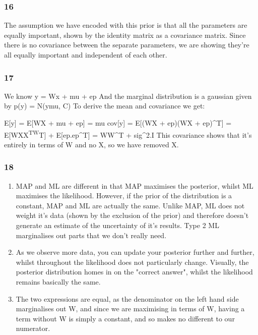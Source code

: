 \documentclass[11pt]{article}
\begin{document}
    \subsubsection{16}\label{section}

The assumption we have encoded with this prior is that all the
parameters are equally important, shown by the identity matrix as a
covariance matrix. Since there is no covariance between the separate
parameters, we are showing they're all equally important and independent
of each other.

    \subsubsection{17}\label{section}

We know y = Wx + mu + ep And the marginal distribution is a gaussian
given by p(y) = N(y\textbar{}mu, C) To derive the mean and covariance we
get:

E{[}y{]} = E{[}WX + mu + ep{]} = mu cov{[}y{]} = E{[}(WX + ep)(WX +
ep)\^{}T{]} = E{[}WXX\textsuperscript{TW}T{]} + E{[}ep.ep\^{}T{]} =
WW\^{}T + sig\^{}2.I This covariance shows that it's entirely in terms
of W and no X, so we have removed X.

    \subsubsection{18}\label{section}

\begin{enumerate}
\def\labelenumi{\alph{enumi})}
\item
  MAP and ML are different in that MAP maximises the posterior, whilst
  ML maximises the likelihood. However, if the prior of the distribution
  is a constant, MAP and ML are actually the same. Unlike MAP, ML does
  not weight it's data (shown by the exclusion of the prior) and
  therefore doesn't generate an estimate of the uncertainty of it's
  results. Type 2 ML marginalises out parts that we don't really need.
\item
  As we observe more data, you can update your posterior further and
  further, whilst throughout the likelihood does not particularly
  change. Visually, the posterior distribution homes in on the "correct
  answer", whilst the likelihood remains basically the same.
\item
  The two expressions are equal, as the denominator on the left hand
  side marginalises out W, and since we are maximising in terms of W,
  having a term without W is simply a constant, and so makes no
  different to our numerator.
\end{enumerate}
\end{document}

